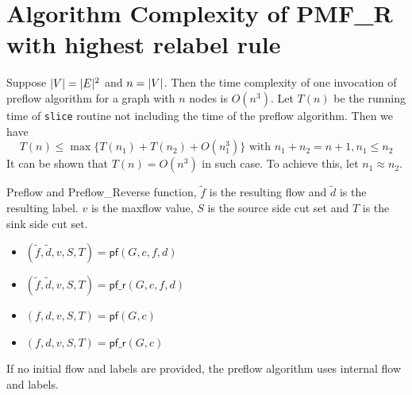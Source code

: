 \documentclass{article}
\begin{document}
\section{Algorithm Complexity of PMF\_R with highest relabel rule}
Suppose $\lvert V\rvert=\lvert E\rvert^2$ and $n=\lvert V\rvert$. Then the time complexity of one invocation of preflow algorithm for a graph with $n$ nodes is $O(n^3)$. Let $T(n)$ be the running time of \texttt{slice} routine not including the time of the preflow algorithm.
Then we have
\begin{equation}
T(n) \leq \max\{T(n_1) + T(n_2) + O(n_1^3)\} \textrm{ with } n_1 + n_2 = n+1, n_1 \leq n_2
\end{equation}
It can be shown that $T(n) = O(n^3)$ in such case. To achieve this,  let $n_1 \approx n_2$.


Preflow and Preflow\_Reverse function, $\tilde{f}$ is the resulting flow and $\tilde{d}$ is the resulting label. $v$ is the maxflow value, $S$ is the source side cut set and $T$ is the sink side cut set.
\begin{itemize}
\item $(\tilde{f}, \tilde{d}, v, S, T) = \textsf{pf}(G, c, f, d)$
\item $(\tilde{f}, \tilde{d}, v, S, T) = \textsf{pf\_r}(G, c, f, d)$
\item $(f, d, v, S, T) = \textsf{pf}(G, c)$
\item $(f, d, v, S, T) = \textsf{pf\_r}(G, c)$
\end{itemize}	
If no initial flow and labels are provided, the preflow algorithm uses internal flow and labels.
\end{document}
